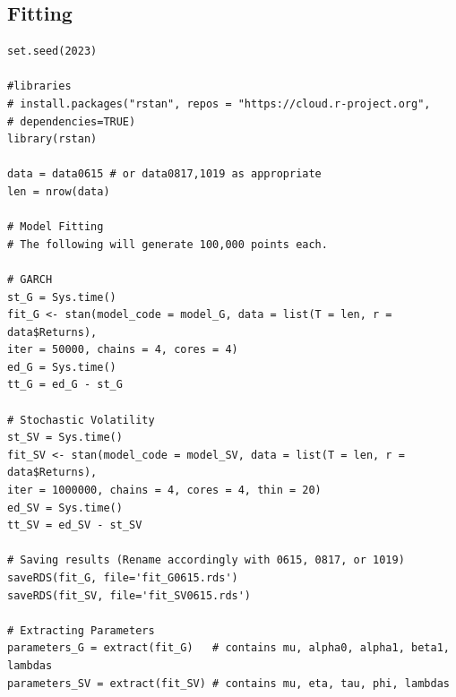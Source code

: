 \documentclass[12pt,letterpaper,reqno,fleqn]{article}
\begin{document}
\subsection{Fitting}
\begin{verbatim}
set.seed(2023)

#libraries
# install.packages("rstan", repos = "https://cloud.r-project.org", 
# dependencies=TRUE)
library(rstan)

data = data0615 # or data0817,1019 as appropriate
len = nrow(data)

# Model Fitting
# The following will generate 100,000 points each.

# GARCH
st_G = Sys.time()
fit_G <- stan(model_code = model_G, data = list(T = len, r = data$Returns), 
iter = 50000, chains = 4, cores = 4)
ed_G = Sys.time()
tt_G = ed_G - st_G

# Stochastic Volatility
st_SV = Sys.time()
fit_SV <- stan(model_code = model_SV, data = list(T = len, r = data$Returns), 
iter = 1000000, chains = 4, cores = 4, thin = 20)
ed_SV = Sys.time()
tt_SV = ed_SV - st_SV

# Saving results (Rename accordingly with 0615, 0817, or 1019)
saveRDS(fit_G, file='fit_G0615.rds')
saveRDS(fit_SV, file='fit_SV0615.rds') 

# Extracting Parameters
parameters_G = extract(fit_G)   # contains mu, alpha0, alpha1, beta1, lambdas
parameters_SV = extract(fit_SV) # contains mu, eta, tau, phi, lambdas

\end{verbatim}
\end{document}
